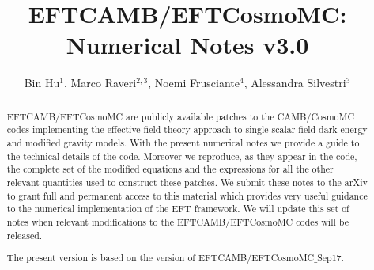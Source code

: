\documentclass[prd,nofootinbib,showpacs]{revtex4}
\begin{document}
\title{EFTCAMB/EFTCosmoMC: Numerical Notes v3.0}
%
\author{Bin Hu$^{1}$, Marco Raveri$^{2,3}$, Noemi Frusciante$^{4}$, Alessandra Silvestri$^{3}$}
%
\smallskip
{}

\begin{abstract}
EFTCAMB/EFTCosmoMC are publicly available patches to the CAMB/CosmoMC codes implementing the effective field theory approach to single scalar field dark energy and modified gravity models. With the present numerical notes we provide a guide to the technical details of the code. Moreover we reproduce, as they appear in the code, the complete set of the modified equations and the expressions for all the other relevant quantities used to construct these patches. We submit these notes to the arXiv to grant full and permanent access to this material which provides very useful guidance to the numerical implementation of the EFT framework. We will update this set of notes when relevant modifications to the EFTCAMB/EFTCosmoMC codes will be released. 

The present version is based on the version of EFTCAMB/EFTCosmoMC$\_$Sep17. 
\end{abstract}
\end{document}
